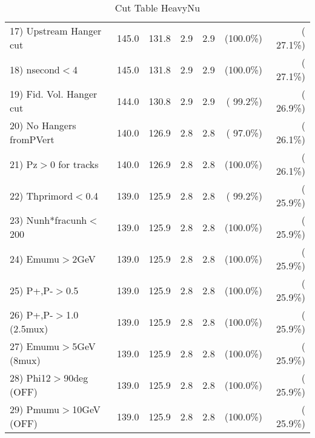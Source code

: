 \begin{table}[h!]
\begin{tabular}{||l||r|r|r|r|r|r||}
 17) Upstream Hanger cut  &        145.0 &        131.8 &          2.9 &          2.9 & (100.0\%) & ( 27.1\%) \\
 18) nsecond$<$4          &        145.0 &        131.8 &          2.9 &          2.9 & (100.0\%) & ( 27.1\%) \\
 19) Fid. Vol. Hanger cut &        144.0 &        130.8 &          2.9 &          2.9 & ( 99.2\%) & ( 26.9\%) \\
 20) No Hangers fromPVert &        140.0 &        126.9 &          2.8 &          2.8 & ( 97.0\%) & ( 26.1\%) \\
 21) Pz$>$0 for tracks    &        140.0 &        126.9 &          2.8 &          2.8 & (100.0\%) & ( 26.1\%) \\
 22) Thprimord$<$0.4      &        139.0 &        125.9 &          2.8 &          2.8 & ( 99.2\%) & ( 25.9\%) \\
 23) Nunh*fracunh$<$200   &        139.0 &        125.9 &          2.8 &          2.8 & (100.0\%) & ( 25.9\%) \\
 24) Emumu$>$2GeV         &        139.0 &        125.9 &          2.8 &          2.8 & (100.0\%) & ( 25.9\%) \\
 25) P+,P-$>$0.5          &        139.0 &        125.9 &          2.8 &          2.8 & (100.0\%) & ( 25.9\%) \\
 26) P+,P-$>$1.0 (2.5mux) &        139.0 &        125.9 &          2.8 &          2.8 & (100.0\%) & ( 25.9\%) \\
 27) Emumu$>$5GeV  (8mux) &        139.0 &        125.9 &          2.8 &          2.8 & (100.0\%) & ( 25.9\%) \\
 28) Phi12$>$90deg  (OFF) &        139.0 &        125.9 &          2.8 &          2.8 & (100.0\%) & ( 25.9\%) \\
 29) Pmumu$>$10GeV  (OFF) &        139.0 &        125.9 &          2.8 &          2.8 & (100.0\%) & ( 25.9\%) \\
 \hline
 \hline
 \end{tabular}
 \caption{Cut Table  HeavyNu  }
 \label{tab-cutheavy_neutrino}
 \end{table}
